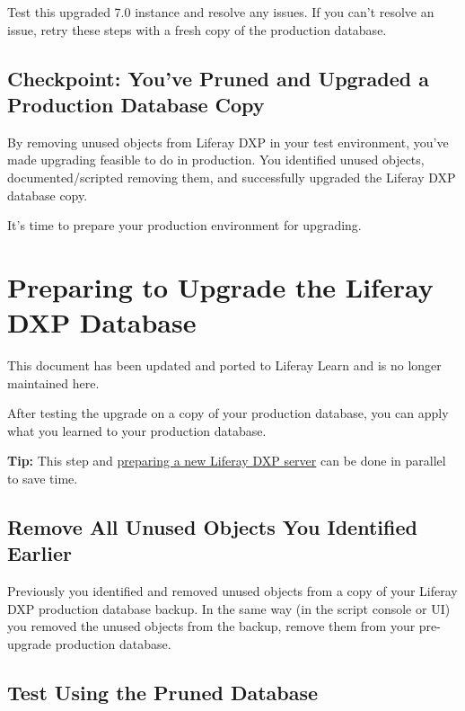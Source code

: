 Test this upgraded 7.0 instance and resolve any issues. If you can't
resolve an issue, retry these steps with a fresh copy of the production
database.

\section{Checkpoint: You've Pruned and Upgraded a Production Database
Copy}\label{checkpoint-youve-pruned-and-upgraded-a-production-database-copy}

By removing unused objects from Liferay DXP in your test environment,
you've made upgrading feasible to do in production. You identified
unused objects, documented/scripted removing them, and successfully
upgraded the Liferay DXP database copy.

It's time to prepare your production environment for upgrading.

\chapter{Preparing to Upgrade the Liferay DXP
Database}\label{preparing-to-upgrade-the-liferay-dxp-database}

{This document has been updated and ported to Liferay Learn and is no
longer maintained here.}

After testing the upgrade on a copy of your production database, you can
apply what you learned to your production database.

\noindent\hrulefill

\textbf{Tip:} This step and
\href{/docs/7-2/deploy/-/knowledge_base/d/preparing-a-new-product-server-for-data-upgrade}{preparing
a new Liferay DXP server} can be done in parallel to save time.

\noindent\hrulefill

\section{Remove All Unused Objects You Identified
Earlier}\label{remove-all-unused-objects-you-identified-earlier}

Previously you identified and removed unused objects from a copy of your
Liferay DXP production database backup. In the same way (in the script
console or UI) you removed the unused objects from the backup, remove
them from your pre-upgrade production database.

\section{Test Using the Pruned
Database}\label{test-using-the-pruned-database}

